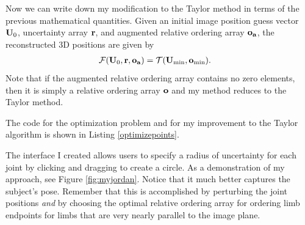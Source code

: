 \documentclass[final]{article}
\newcommand{\trm}[1]{\textrm{#1}}
\begin{document}
\begin{spacing}{1.1}
Now we can write down my modification to the Taylor method in terms of the previous mathematical quantities. Given an initial image position guess vector $\vb{U}_0$, uncertainty array $\vb{r}$, and augmented relative ordering array $\vb{o_a}$, the reconstructed 3D positions are given by
\begin{align}
  \mathcal{F}(\vb{U}_0,\vb{r},\vb{o_a}) &= \mathcal{T}\qty(\vb{U}_{\trm{min}},\vb{o}_{\trm{min}}).
  \label{eq:mymethod}
\end{align}
Note that if the augmented relative ordering array contains no zero elements, then it is simply a relative ordering array $\vb{o}$ and my method reduces to the Taylor method.

The code for the optimization problem and for my improvement to the Taylor algorithm is shown in Listing \ref{optimizepoints}.

The interface I created allows users to specify a radius of uncertainty for each joint by clicking and dragging to create a circle. As a demonstration of my approach, see Figure \ref{fig:myjordan}. Notice that it much better captures the subject's pose. Remember that this is accomplished by perturbing the joint positions \emph{and} by choosing the optimal relative ordering array for ordering limb endpoints for limbs that are very nearly parallel to the image plane.


\end{spacing}
\end{document}

